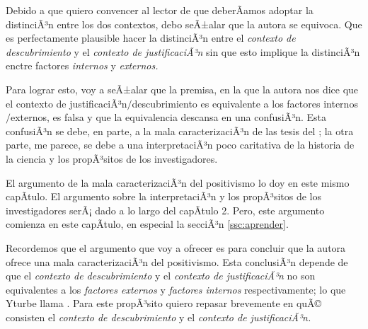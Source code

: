Debido a que quiero convencer al lector de que deberÃ­amos adoptar la distinciÃ³n entre los dos contextos, debo seÃ±alar que la autora se equivoca.
Que es perfectamente plausible hacer la distinciÃ³n entre el \emph{contexto de descubrimiento} y el \emph{contexto de justificaciÃ³n} sin que esto implique la distinciÃ³n enctre factores \emph{internos} y \emph{externos.}

Para lograr esto, voy a seÃ±alar que la premisa, en la que la autora nos dice que el contexto de justificaciÃ³n$/$descubrimiento es equivalente a los factores internos$/$externos, es falsa y que la equivalencia descansa en una confusiÃ³n.
Esta confusiÃ³n se debe, en parte, a la mala caracterizaciÃ³n de las tesis del ; la otra parte, me parece, se debe a una interpretaciÃ³n poco caritativa de la historia de la ciencia y los propÃ³sitos de los investigadores.

El argumento de la mala caracterizaciÃ³n del positivismo lo doy en este mismo capÃ­tulo.
El argumento sobre la interpretaciÃ³n y los propÃ³sitos de los investigadores serÃ¡ dado a lo largo del capÃ­tulo 2.
Pero, este argumento comienza en este capÃ­tulo, en especial la secciÃ³n \ref{ssc:aprender}.

Recordemos que el argumento que voy a ofrecer es para concluir que la autora ofrece una mala caracterizaciÃ³n del positivismo.
Esta conclusiÃ³n depende de que el \emph{contexto de descubrimiento} y el \emph{contexto de justificaciÃ³n} no son equivalentes a los \emph{factores externos} y \emph{factores internos} respectivamente; lo que Yturbe llama .
Para este propÃ³sito quiero repasar brevemente en quÃ© consisten el \emph{contexto de descubrimiento} y el \emph{contexto de justificaciÃ³n.}



